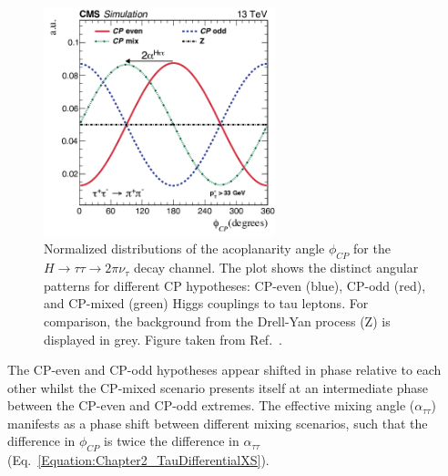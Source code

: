 \begin{figure}[h]
\centering
\includegraphics[width= 0.6\textwidth]{Figures/Chapter2/CP_Scenarios_MixingAngle.png}
\caption{Normalized distributions of the acoplanarity angle $\phi_{CP}$ for the $H \rightarrow \tau\tau \rightarrow 2\pi\nu_{\tau}$ decay channel. The plot shows the distinct angular patterns for different CP hypotheses: CP-even (blue), CP-odd (red), and CP-mixed (green) Higgs couplings to tau leptons. For comparison, the background from the Drell-Yan process (Z) is displayed in grey. Figure taken from Ref.~\cite{HiggsCP_CMS_2021}.}
\label{Figure:Chapter2_PhiCP_Gen}
\end{figure}

The CP-even and CP-odd hypotheses appear shifted in phase relative to each other whilst the CP-mixed scenario presents itself at an intermediate phase between the CP-even and CP-odd extremes. The effective mixing angle ($\alpha_{\tau\tau}$) manifests as a phase shift between different mixing scenarios, such that the difference in $\phi_{CP}$ is twice the difference in 
$\alpha_{\tau\tau}$ (Eq.~\ref{Equation:Chapter2_TauDifferentialXS}).